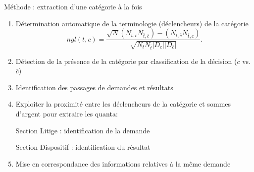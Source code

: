 \begin{frame}[c]{Méthode : extraction d'une catégorie à la fois}
	\begin{enumerate} \scriptsize
		\item Détermination automatique de la terminologie (déclencheurs) de la catégorie \[ngl(t,c) = \frac{\sqrt{N} (N_{t,c} N_{\overline{t},\overline{c}}) - (N_{t,\overline{c}} N_{\overline{t},c})}{\sqrt{N_t N_{\overline{t}} \vert D_c \vert \vert D_{\overline{c}} \vert }}.\]
		\item Détection de la présence de la catégorie par classification de la décision ($c$ vs. $\overline{c}$)
		\item Identification des passages de demandes et résultats 
		\item Exploiter la proximité entre les déclencheurs de la catégorie  et sommes d’argent pour extraire les quanta:
		
		Section Litige : identification de la demande
		
	
	Section Dispositif : identification du résultat
		\item Mise en correspondance des informations relatives à la même demande
	\end{enumerate}
	
\end{frame}

